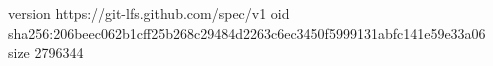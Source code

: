 version https://git-lfs.github.com/spec/v1
oid sha256:206beec062b1cff25b268c29484d2263c6ec3450f5999131abfc141e59e33a06
size 2796344
